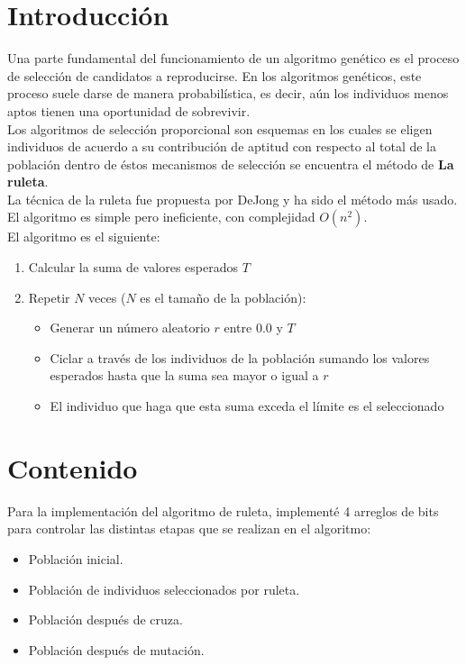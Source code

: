 \documentclass[11pt,letterpaper]{article}
\begin{document}


\section*{Introducción}
Una parte fundamental del funcionamiento de un algoritmo genético es el proceso de selección de candidatos a reproducirse. En los algoritmos genéticos, este proceso suele darse de manera probabilística, es decir, aún los individuos menos aptos tienen una oportunidad de sobrevivir.\\

Los algoritmos de selección proporcional son esquemas en los cuales se eligen individuos de acuerdo a su contribución de aptitud con respecto al total de la población dentro de éstos mecanismos de selección se encuentra el método de \textbf{La ruleta}.\\

La técnica de la ruleta fue propuesta por DeJong y ha sido el método más usado. El algoritmo es simple pero ineficiente, con complejidad $O(n^{2})$.\\

El algoritmo es el siguiente:
\begin{enumerate}
	\item Calcular la suma de valores esperados $T$
	\item Repetir $N$ veces ($N$ es el tamaño de la población):
	\begin{itemize}
		\item Generar un número aleatorio $r$ entre 0.0 y $T$
		\item Ciclar a través de los individuos de la población sumando los valores esperados hasta que la suma sea mayor o igual a $r$
		\item El individuo que haga que esta suma exceda el límite es el seleccionado
	\end{itemize}
\end{enumerate}


\section*{Contenido}
Para la implementación del algoritmo de ruleta, implementé 4 arreglos de bits para controlar las distintas etapas que se realizan en el algoritmo:
\begin{itemize}
	\item Población inicial.
	\item Población de individuos seleccionados por ruleta.
	\item Población después de cruza.
	\item Población después de mutación.
\end{itemize}
\end{document}
